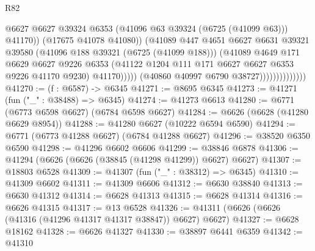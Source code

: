 \begin{lexlean}{R82}
\begin{coremodule}
                                          @6627
                                          @6627
                                          @39324
                                          @6353
                                          (@41096 @63 @39324 (@6725 (@41099 @63)))
                                          @41170))
                                      (@17675 @41078 @41080))
                                    (@41089
                                      @447
                                      @4651
                                      @6627
                                      @6631
                                      @39321
                                      @39580
                                      (@41096 @188 @39321 (@6725 (@41099 @188)))
                                      (@41089
                                        @4649
                                        @171
                                        @6629
                                        @6627
                                        @9226
                                        @6353
                                        (@41122
                                          @1204
                                          @111
                                          @171
                                          @6627
                                          @6627
                                          @6353
                                          @9226
                                          @41170
                                          @9230)
                                        @41170)))))
                              (@40860 @40997 @6790 @38727))))))))))))))
@41270 := (f : @6587) -> @6345
@41271 := @8695 @6345
@41273 := @41271 (fun ("_" : @38488) => @6345)
@41274 := @41273 @6613
@41280 := @6771 (@6773 @6598 @6627) (@6784 @6598 @6627)
@41284 := @6626 (@6628 (@41280 @6629 @8954))
@41288 := @41280 @6627 (@10222 @6594 @6590)
@41294 := @6771 (@6773 @41288 @6627) (@6784 @41288 @6627)
@41296 := @38520 @6350 @6590
@41298 := @41296 @6602 @6606
@41299 := @38846 @6878
@41306 := @41294 (@6626 (@6626 (@38845 (@41298 @41299)) @6627) @6627)
@41307 := @18803 @6528
@41309 := @41307 (fun ("_" : @38312) => @6345)
@41310 := @41309 @6602
@41311 := @41309 @6606
@41312 := @6630 @38840
@41313 := @6630 @41312
@41314 := @6628 @41313
@41315 := @6628 @41314
@41316 := @6626 @41315
@41317 := @13 @6528
@41326 := @41311 (@6626 (@6626 (@41316 (@41296 @41317 @41317 @38847)) @6627) @6627)
@41327 := @6628 @18162
@41328 := @6626 @41327
@41330 := @38897 @6441 @6359
@41342 := @41310

\end{coremodule}
\end{lexlean}
